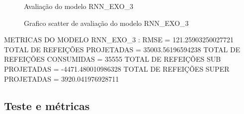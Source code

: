 \documentclass[	12pt, Times, openright, twoside, a4paper, english, brazil]{abntex2}
\begin{document}
                \begin{figure}[!ht]
                  \caption{Avaliação do modelo RNN\_EXO\_3 \label{fig:case1_rnn_exo_3_val} }
                \end{figure}
                \begin{figure}[!ht]
                  \caption{Grafico scatter de avaliação do modelo RNN\_EXO\_3 \label{fig:case1_rnn_exo_3_val_scatter} }
                \end{figure}
                METRICAS DO MODELO RNN\_EXO\_3 : \newline
                RMSE = 121.25903250027721\newline
                TOTAL DE REFEIÇÕES PROJETADAS = 35003.56196594238\newline
                TOTAL DE REFEIÇÕES CONSUMIDAS = 35555\newline
                TOTAL DE REFEIÇÕES SUB PROJETADAS = -4471.480010986328\newline
                TOTAL DE REFEIÇÕES SUPER PROJETADAS = 3920.041976928711\newline
        \newpage
    	\subsection{Teste e métricas}
\end{document}
